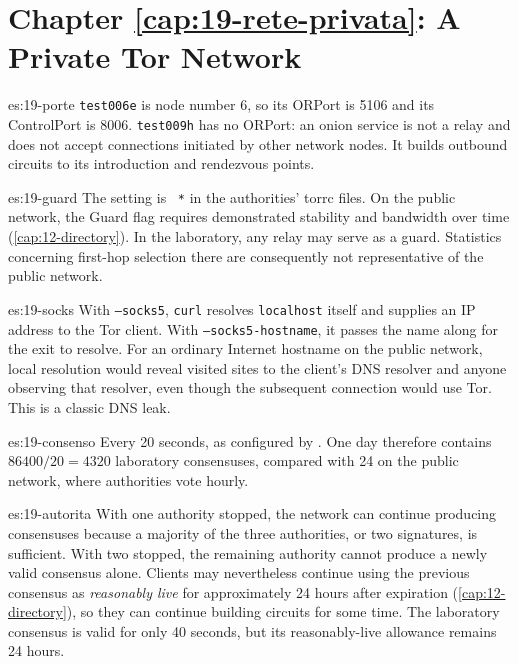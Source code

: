 \section*{Chapter \ref{cap:19-rete-privata}: A Private Tor Network}

\begin{soluzione}{es:19-porte}
\texttt{test006e} is node number 6, so its ORPort is 5106 and its ControlPort is 8006. \texttt{test009h} has no ORPort: an onion service is not a relay and does not accept connections initiated by other network nodes. It builds outbound circuits to its introduction and rendezvous points.
\end{soluzione}

\begin{soluzione}{es:19-guard}
The setting is ~\texttt{*} in the authorities' torrc files. On the public network, the Guard flag requires demonstrated stability and bandwidth over time (\cref{cap:12-directory}). In the laboratory, any relay may serve as a guard. Statistics concerning first-hop selection there are consequently not representative of the public network.
\end{soluzione}

\begin{soluzione}{es:19-socks}
With \texttt{--socks5}, \texttt{curl} resolves \texttt{localhost} itself and supplies an IP address to the Tor client. With \texttt{--socks5-hostname}, it passes the name along for the exit to resolve. For an ordinary Internet hostname on the public network, local resolution would reveal visited sites to the client's DNS resolver and anyone observing that resolver, even though the subsequent connection would use Tor. This is a classic DNS leak.
\end{soluzione}

\begin{soluzione}{es:19-consenso}
Every 20 seconds, as configured by . One day therefore contains $86400/20 = 4320$ laboratory consensuses, compared with 24 on the public network, where authorities vote hourly.
\end{soluzione}

\begin{soluzione}{es:19-autorita}
With one authority stopped, the network can continue producing consensuses because a majority of the three authorities, or two signatures, is sufficient. With two stopped, the remaining authority cannot produce a newly valid consensus alone. Clients may nevertheless continue using the previous consensus as \emph{reasonably live} for approximately 24 hours after expiration (\cref{cap:12-directory}), so they can continue building circuits for some time. The laboratory consensus is valid for only 40 seconds, but its reasonably-live allowance remains 24 hours.
\end{soluzione}

